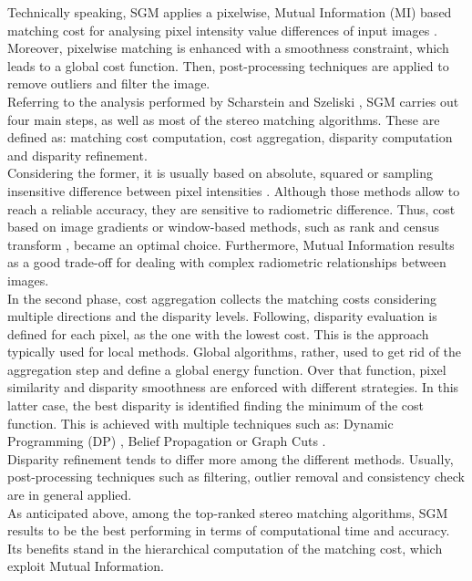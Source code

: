 Technically speaking, SGM applies a pixelwise, Mutual Information (MI) based matching cost for analysing pixel intensity value differences of input images \citep{Hirschmuller2008}.
Moreover, pixelwise matching is enhanced with a smoothness constraint, which leads to a global cost function. 
Then, post-processing techniques are applied to remove outliers and filter the image.\\
Referring to the analysis performed by Scharstein and Szeliski \citep{Scharstein2001}, SGM carries out four main steps, as well as most of the stereo matching algorithms. 
These are defined as: matching cost computation, cost aggregation, disparity computation and disparity refinement. \\
Considering the former, it is usually based on absolute, squared or sampling insensitive difference between pixel intensities \citep{Hirschmuller2008}. Although those methods allow to reach a reliable accuracy, they are sensitive to radiometric difference. 
Thus, cost based on image gradients or window-based methods, such as rank and census transform \citep{Ko2017}, became an optimal choice. 
Furthermore, Mutual Information results as a good trade-off for dealing with complex radiometric relationships between images.\\
In the second phase, cost aggregation collects the matching costs considering multiple directions and the disparity levels. 
Following, disparity evaluation is defined for each pixel, as the one with the lowest cost. This is the approach typically used for local methods. 
Global algorithms, rather, used to get rid of the aggregation step and define a global energy function. 
Over that function, pixel similarity and disparity smoothness are enforced with different strategies. In this latter case, the best disparity is identified finding the minimum of the cost function. This is achieved with multiple techniques such as: Dynamic Programming (DP) \citep{Birchfield1999}, Belief Propagation \citep{Klaus2006} or Graph Cuts \citep{Kolmogorov2001}.\\
Disparity refinement tends to differ more among the different methods. Usually, post-processing techniques such as filtering, outlier removal and consistency check are in general applied.\\
As anticipated above, among the top-ranked stereo matching algorithms, SGM results to be the best performing in terms of computational time and accuracy. 
Its benefits stand in the hierarchical computation of the matching cost, which exploit Mutual Information. 
